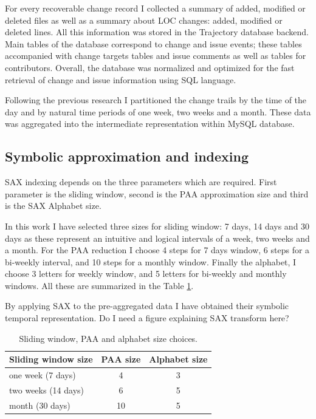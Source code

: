\documentclass[10pt, conference, compsocconf]{IEEEtran}
\begin{document}
For every recoverable change record I collected a summary of added, modified or deleted files 
as well as a summary about LOC changes: added, modified or deleted lines. All this information 
was stored in the Trajectory database backend. Main tables of the database correspond to change 
and issue events; these tables accompanied with change targets tables and issue comments as 
well as tables for contributors. Overall, the database was normalized and optimized for the fast 
retrieval of change and issue information using SQL language.

Following the previous research I partitioned the change trails by the time of the day and 
by natural time periods of one week, two weeks and a month. These data was aggregated into the 
intermediate representation within MySQL database.

\subsection{Symbolic approximation and indexing}
SAX indexing depends on the three parameters which are required. First parameter is
the sliding window, second is the PAA approximation size and third is the SAX Alphabet size.

In this work I have selected three sizes for sliding window: 7 days, 14 days and 30 days as 
these represent an intuitive and logical intervals of a week, two weeks and a month. 
For the PAA reduction I choose 4 steps for 7 days window, 6 steps for a bi-weekly interval,
and 10 steps for a monthly window.
Finally the alphabet, I choose 3 letters for weekly window, and 5 letters for bi-weekly and monthly windows.
All these are summarized in the Table \ref{tab:parameters}.

By applying SAX to the pre-aggregated data I have obtained their symbolic temporal 
representation. Do I need a figure explaining SAX transform here?

\begin{table}
  \caption{Sliding window, PAA and alphabet size choices.}
  \centering
  \label{tab:parameters}
  \begin{tabular}{ | l | c | c |}
  \hline                       
  Sliding window size & PAA size & Alphabet size \\
  \hline 
    one week (7 days) & 4 & 3 \\  
    two weeks (14 days) & 6 & 5 \\ 
    month (30 days) & 10 & 5 \\ 
  \hline  
  \end{tabular}
\end{table}
\end{document}
